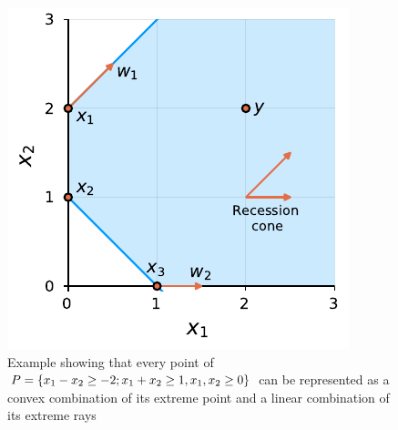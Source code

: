 \begin{figure}[h]
	\includegraphics{part_1/chapter_6/Figures/Figure5}
	\caption{Example showing that every point of $P = \left\{ x_1 - x_2 \geq -2; x_1 + x_2 \geq 1, x_1,x_2 \geq 0 \right \}$ can be represented as a convex combination of its extreme point and a linear combination of its extreme rays} \label{p1c6:fig:resolution_example}
\end{figure}


